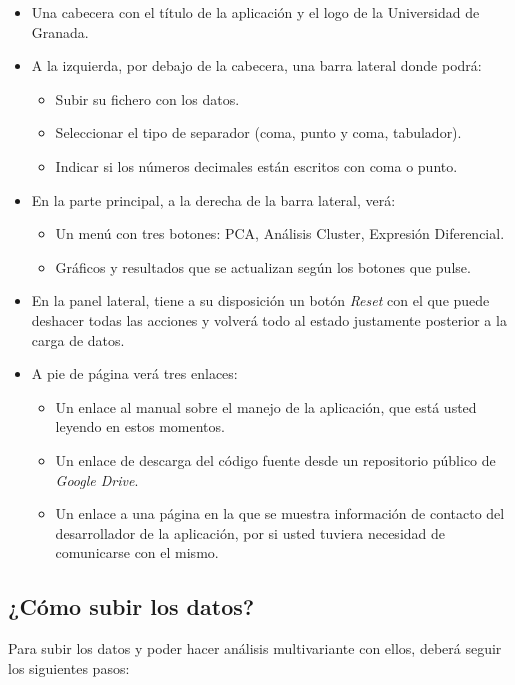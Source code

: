 \begin{itemize}
    \item Una cabecera con el título de la aplicación y el logo de la Universidad de Granada.
    \item A la izquierda, por debajo de la cabecera, una barra lateral donde podrá:
    \begin{itemize}
        \item Subir su fichero con los datos.
        \item Seleccionar el tipo de separador (coma, punto y coma, tabulador).
        \item Indicar si los números decimales están escritos con coma o punto.
    \end{itemize}
    \item En la parte principal, a la derecha de la barra lateral, verá:
    \begin{itemize}
        \item Un menú con tres botones: PCA, Análisis Cluster, Expresión Diferencial.
        \item Gráficos y resultados que se actualizan según los botones que pulse.
    \end{itemize}
    \item En la panel lateral, tiene a su disposición un botón \textit{Reset} con el que puede deshacer 
    todas las acciones y volverá todo al estado justamente posterior a la carga de datos.
    \item A pie de página verá tres enlaces:
    \begin{itemize}
        \item Un enlace al manual sobre el manejo de la aplicación, que está usted leyendo en estos momentos.
        \item Un enlace de descarga del código fuente desde un repositorio público de \textit{Google Drive}.
        \item Un enlace a una página en la que se muestra información de contacto del desarrollador de la aplicación,
        por si usted tuviera necesidad de comunicarse con el mismo.
    \end{itemize}
\end{itemize}

\subsection{¿Cómo subir los datos?}

Para subir los datos y poder hacer análisis multivariante con ellos, deberá seguir los siguientes pasos:

